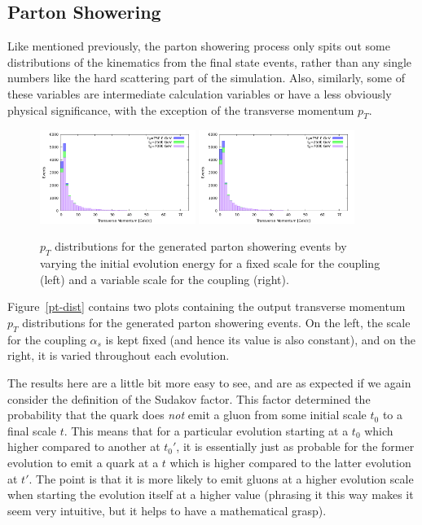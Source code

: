 \subsection{Parton Showering}

Like mentioned previously, the parton showering process only spits out some distributions of the kinematics from the final state events, rather than any single numbers like the hard scattering part of the simulation. Also, similarly, some of these variables are intermediate calculation variables or have a less obviously physical significance, with the exception of the transverse momentum $p_T$.
\begin{figure}[ht]
  \centering
  \includegraphics[width=0.45\textwidth]{./res/gfx/pt-fixed.pdf}
  \includegraphics[width=0.45\textwidth]{./res/gfx/pt-variable.pdf}
  \caption{$p_T$ distributions for the generated parton showering events by varying the initial evolution energy for a fixed scale for the coupling (left) and a variable scale for the coupling (right).}
  \label{fig:pt-dist}
\end{figure}

Figure~\ref{pt-dist} contains two plots containing the output transverse momentum $p_T$ distributions for the generated parton showering events. On the left, the scale for the coupling $\alpha_s$ is kept fixed (and hence its value is also constant), and on the right, it is varied throughout each evolution.

The results here are a little bit more easy to see, and are as expected if we again consider the definition of the Sudakov factor. This factor determined the probability that the quark does \textit{not} emit a gluon from some initial scale $t_0$ to a final scale $t$. This means that for a particular evolution starting at a $t_0$ which higher compared to another at $t_0'$, it is essentially just as probable for the former evolution to emit a quark at a $t$ which is higher compared to the latter evolution at $t'$. The point is that it is more likely to emit gluons at a higher evolution scale when starting the evolution itself at a higher value (phrasing it this way makes it seem very intuitive, but it helps to have a mathematical grasp).


